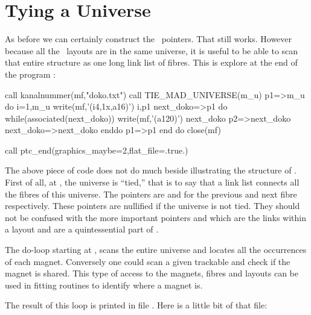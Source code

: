 { 
\section{Tying a Universe}
\label{sec:model.tie}

As before we can certainly construct the \DNA\ pointers. That still works. However because all the \DNA\ layouts  are in the same universe, it is useful to be able to scan that entire structure as one long link list of fibres. This is explore at the end of the program :

 
{ 
\begin{ptccode}
call kanalnummer(mf,"doko.txt")
call TIE_MAD_UNIVERSE(m_u)    \label{lin:tie:uni}
p1=>m_u%
do i=1,m_u%
 write(mf,'(i4,1x,a16)') i,p1%
 next_doko=>p1%
  do while(associated(next_doko))
   write(mf,'(a120)') next_doko%
   p2=>next_doko%
   next_doko=>next_doko%
 enddo
 p1=>p1%
end do
close(mf)

call ptc_end(graphics_maybe=2,flat_file=.true.)  \label{lin:ptc:end}
                                  
\end{ptccode}
}

The above piece of code does not do much beside illustrating the structure  of \PTC . First of all, at , the universe  is ``tied,'' that is to say that a link list connects all the fibres of this universe. The pointers are  and  for the previous and next fibre respectively. These pointers are nullified if the universe is not tied. They should not be confused with the more important pointers  and   which are the links within a layout and are a quintessential part of \PTC .

The do-loop starting at , scans the entire universe and locates all the occurrences of each magnet. Conversely one could scan a given trackable and check if the magnet is shared. This type of access to the magnets, fibres and layouts can be used in fitting routines to identify where a magnet is.

The result of this loop is printed in file . Here is a little bit of that file:

}
